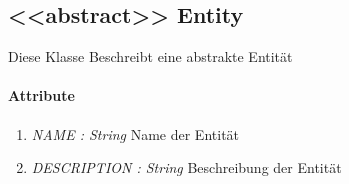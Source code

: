 \subsection*{<{<{abstract}>}> Entity}\label{ent}
Diese Klasse Beschreibt eine abstrakte Entität 

\paragraph{Attribute}
\begin{enumerate}[$\bullet$]
	\item \textit{NAME : String} Name der Entität
	\item \textit{DESCRIPTION : String} Beschreibung der Entität
\end{enumerate}

